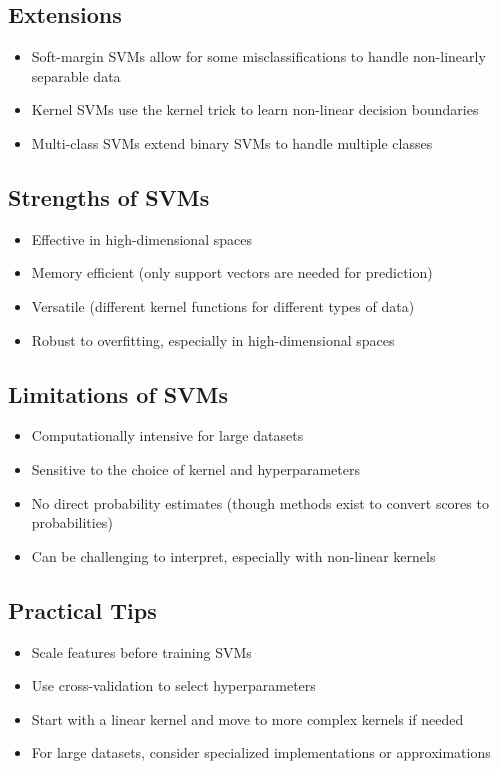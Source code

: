 \documentclass{article}
\begin{document}
\subsection{Extensions}
\begin{itemize}
    \item Soft-margin SVMs allow for some misclassifications to handle non-linearly separable data
    \item Kernel SVMs use the kernel trick to learn non-linear decision boundaries
    \item Multi-class SVMs extend binary SVMs to handle multiple classes
\end{itemize}

\subsection{Strengths of SVMs}
\begin{itemize}
    \item Effective in high-dimensional spaces
    \item Memory efficient (only support vectors are needed for prediction)
    \item Versatile (different kernel functions for different types of data)
    \item Robust to overfitting, especially in high-dimensional spaces
\end{itemize}

\subsection{Limitations of SVMs}
\begin{itemize}
    \item Computationally intensive for large datasets
    \item Sensitive to the choice of kernel and hyperparameters
    \item No direct probability estimates (though methods exist to convert scores to probabilities)
    \item Can be challenging to interpret, especially with non-linear kernels
\end{itemize}

\subsection{Practical Tips}
\begin{itemize}
    \item Scale features before training SVMs
    \item Use cross-validation to select hyperparameters
    \item Start with a linear kernel and move to more complex kernels if needed
    \item For large datasets, consider specialized implementations or approximations
\end{itemize}
\end{document}
